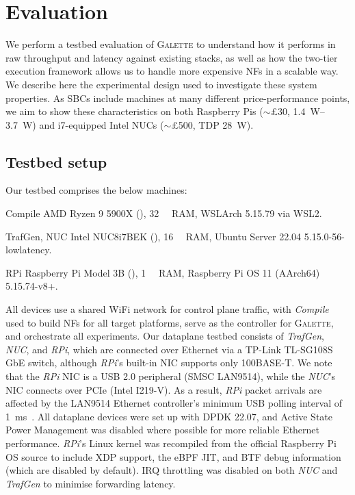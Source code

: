 \documentclass[comsoc, conference, times]{IEEEtran}
\newcommand{\ourtech}{\textsc{Galette}}
\begin{document}

\section{Evaluation}\label{sec:evaluation}
We perform a testbed evaluation of \ourtech{} to understand how it performs in raw throughput and latency against existing stacks, as well as how the two-tier execution framework allows us to handle more expensive NFs in a scalable way.
We describe here the experimental design used to investigate these system properties.
As SBCs include machines at many different price-performance points, we aim to show these characteristics on both Raspberry Pis ($\sim$£30, \qtyrange{1.4}{3.7}{\watt}) and i7-equipped Intel NUCs ($\sim$£500, TDP \qty{28}{\watt}).

\subsection{Testbed setup}
Our testbed comprises the below machines:
\begin{LaTeXdescription}
	\item[Compile] AMD Ryzen 9 5900X (), \qty{32}{\gibi\byte} RAM, WSLArch 5.15.79 via WSL2.
	\item[TrafGen, NUC] Intel NUC8i7BEK (), \qty{16}{\gibi\byte} RAM, Ubuntu Server 22.04 5.15.0-56-lowlatency.
	\item[RPi] Raspberry Pi Model 3B (), \qty{1}{\gibi\byte} RAM, Raspberry Pi OS 11 (AArch64) 5.15.74-v8+.
\end{LaTeXdescription}
All devices use a shared WiFi network for control plane traffic, with \emph{Compile} used to build NFs for all target platforms, serve as the controller for \ourtech, and orchestrate all experiments.
Our dataplane testbed consists of \emph{TrafGen}, \emph{NUC}, and \emph{RPi}, which are connected over Ethernet via a TP-Link TL-SG108S GbE switch, although \emph{RPi}'s built-in NIC supports only 100BASE-T.
We note that the \emph{RPi} NIC is a USB 2.0 peripheral (SMSC LAN9514), while the \emph{NUC}'s NIC connects over PCIe (Intel I219-V).
As a result, \emph{RPi} packet arrivals are affected by the LAN9514 Ethernet controller's minimum USB polling interval of \qty{1}{\milli\second}~\parencite[p.~32]{rpi-lanchip}.
All dataplane devices were set up with DPDK 22.07, and Active State Power Management was disabled where possible for more reliable Ethernet performance.
\emph{RPi}'s Linux kernel was recompiled from the official Raspberry Pi OS source to include XDP support, the eBPF JIT, and BTF debug information (which are disabled by default).
IRQ throttling was disabled on both \emph{NUC} and \emph{TrafGen} to minimise forwarding latency.
\end{document}
